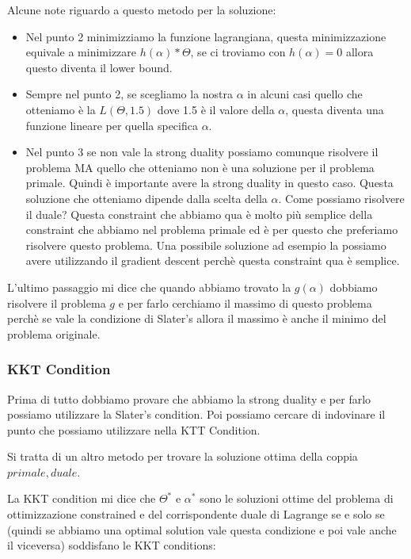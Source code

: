 \documentclass[14pt]{extreport}
\begin{document}
Alcune note riguardo a questo metodo per la soluzione:
\begin{itemize}
\item Nel punto 2 minimizziamo la funzione lagrangiana, questa minimizzazione equivale a minimizzare $h(\alpha)*\Theta$, se ci troviamo con $h(\alpha)
= 0$ allora questo diventa il lower bound.
\item Sempre nel punto 2, se scegliamo la nostra $\alpha$ in alcuni casi quello che otteniamo è la $L(\Theta, 1.5)$ dove 1.5 è il valore della
$\alpha$, questa diventa una funzione lineare per quella specifica $\alpha$.
\item Nel punto 3 se non vale la strong duality possiamo comunque risolvere il problema MA quello che otteniamo non è una soluzione per il problema
primale. Quindi è importante avere la strong duality in questo caso. Questa soluzione che otteniamo dipende dalla scelta della $\alpha$. Come possiamo
risolvere il duale? Questa constraint che abbiamo qua è molto più semplice della constraint che abbiamo nel problema primale ed è per questo che
preferiamo risolvere questo problema. Una possibile soluzione ad esempio la possiamo avere utilizzando il gradient descent perchè questa constraint
qua è semplice.
\end{itemize}



L'ultimo passaggio mi dice che quando abbiamo trovato la $g(\alpha)$ dobbiamo risolvere il problema $g$ e per farlo cerchiamo il massimo di questo
problema perchè se vale la condizione di Slater's allora il massimo è anche il minimo del problema originale.

\subsubsection{KKT Condition}

Prima di tutto dobbiamo provare che abbiamo la strong duality e per farlo possiamo utilizzare la Slater's condition. Poi possiamo cercare di
indovinare il punto che possiamo utilizzare nella KTT Condition.

Si tratta di un altro metodo per trovare la soluzione ottima della coppia $primale, duale$.

La KKT condition mi dice che $\Theta^*$ e $\alpha^*$ sono le soluzioni ottime del problema di ottimizzazione constrained e del corrispondente duale di
Lagrange se e solo se (quindi se abbiamo una optimal solution vale questa condizione e poi vale anche il viceversa) soddisfano le KKT conditions:
\end{document}
